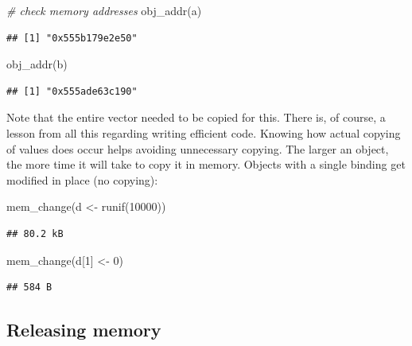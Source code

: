 \documentclass[
  12pt,
]{style/krantz}
\newenvironment{Shaded}{\begin{snugshade}}{\end{snugshade}}
\newcommand{\CommentTok}[1]{\textcolor[rgb]{0.56,0.35,0.01}{\textit{#1}}}
\newcommand{\DecValTok}[1]{\textcolor[rgb]{0.00,0.00,0.81}{#1}}
\newcommand{\FunctionTok}[1]{\textcolor[rgb]{0.00,0.00,0.00}{#1}}
\newcommand{\NormalTok}[1]{#1}
\newcommand{\OtherTok}[1]{\textcolor[rgb]{0.56,0.35,0.01}{#1}}
\begin{document}
\begin{Shaded}
\begin{Highlighting}[]
\CommentTok{\# check memory addresses}
\FunctionTok{obj\_addr}\NormalTok{(a)}
\end{Highlighting}
\end{Shaded}

\begin{verbatim}
## [1] "0x555b179e2e50"
\end{verbatim}

\begin{Shaded}
\begin{Highlighting}[]
\FunctionTok{obj\_addr}\NormalTok{(b)}
\end{Highlighting}
\end{Shaded}

\begin{verbatim}
## [1] "0x555ade63c190"
\end{verbatim}

Note that the entire vector needed to be copied for this. There is, of course, a lesson from all this regarding writing efficient code. Knowing how actual copying of values does occur helps avoiding unnecessary copying. The larger an object, the more time it will take to copy it in memory. Objects with a single binding get modified in place (no copying):

\begin{Shaded}
\begin{Highlighting}[]
\FunctionTok{mem\_change}\NormalTok{(d }\OtherTok{\textless{}{-}} \FunctionTok{runif}\NormalTok{(}\DecValTok{10000}\NormalTok{))}
\end{Highlighting}
\end{Shaded}

\begin{verbatim}
## 80.2 kB
\end{verbatim}

\begin{Shaded}
\begin{Highlighting}[]
\FunctionTok{mem\_change}\NormalTok{(d[}\DecValTok{1}\NormalTok{] }\OtherTok{\textless{}{-}} \DecValTok{0}\NormalTok{)}
\end{Highlighting}
\end{Shaded}

\begin{verbatim}
## 584 B
\end{verbatim}

\hypertarget{releasing-memory}{%
\subsection{Releasing memory}\label{releasing-memory}}
\end{document}
